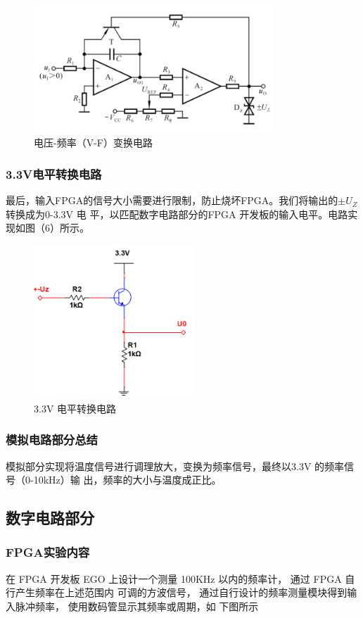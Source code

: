 \documentclass[12pt,a4paper]{ctexart}
\begin{document}
\begin{figure}[H]
  \centering
  \includegraphics[width=9cm]{pic/2.1.5.png}
  \caption{电压-频率（V-F）变换电路}
\end{figure}

\subsubsection{3.3V电平转换电路}
最后，输入FPGA的信号大小需要进行限制，防止烧坏FPGA。我们将输出的$\pm U_Z$转换成为0-3.3V 电
平，以匹配数字电路部分的FPGA
开发板的输入电平。电路实现如图（6）所示。
\begin{figure}[H]
  \centering
  \includegraphics[width=6cm]{pic/2.1.6.png}
  \caption{3.3V 电平转换电路}
\end{figure}

\subsubsection{模拟电路部分总结}
模拟部分实现将温度信号进行调理放大，变换为频率信号，最终以3.3V 的频率信号（0-10kHz）输
出，频率的大小与温度成正比。

\subsection{数字电路部分}

\subsubsection{FPGA实验内容}
在 FPGA 开发板 EGO 上设计一个测量 100KHz 以内的频率计， 通过 FPGA 自行产生频率在上述范围内
可调的方波信号， 通过自行设计的频率测量模块得到输入脉冲频率， 使用数码管显示其频率或周期，如
下图所示
\end{document}
